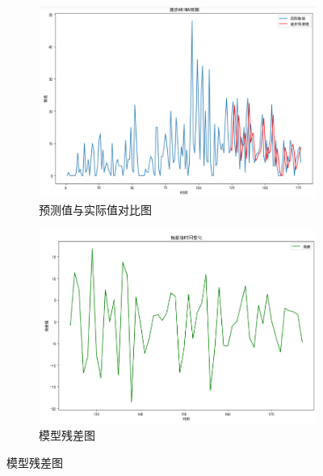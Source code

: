 \documentclass{cumcmthesis}
\begin{document}
        \begin{figure}[ht]
            \centering
            \begin{subfigure}[b]{0.49\textwidth}
                \includegraphics[width=\textwidth]{graph/graph_4.png}
                \caption{预测值与实际值对比图}
                \label{fig:image1}
            \end{subfigure}
            \hfill %
            \begin{subfigure}[b]{0.49\textwidth}
                \includegraphics[width=\textwidth]{graph/graph_7.png}
                \caption{模型残差图}
                \label{fig:image2}
            \end{subfigure}


\end{figure}
\end{document}
